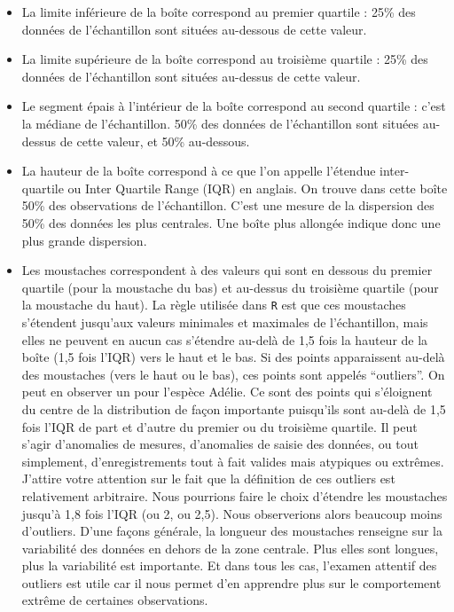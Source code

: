 \documentclass[
  a4paper,
  DIV=11,
  numbers=noendperiod,
  oneside]{scrreprt}
\providecommand{\tightlist}{%
  \setlength{\itemsep}{0pt}\setlength{\parskip}{0pt}}\usepackage{longtable,booktabs,array}
\begin{document}
\begin{itemize}
\tightlist
\item
  La limite inférieure de la boîte correspond au premier quartile : 25\%
  des données de l'échantillon sont situées au-dessous de cette valeur.
\item
  La limite supérieure de la boîte correspond au troisième quartile :
  25\% des données de l'échantillon sont situées au-dessus de cette
  valeur.
\item
  Le segment épais à l'intérieur de la boîte correspond au second
  quartile : c'est la médiane de l'échantillon. 50\% des données de
  l'échantillon sont situées au-dessus de cette valeur, et 50\%
  au-dessous.
\item
  La hauteur de la boîte correspond à ce que l'on appelle l'étendue
  inter-quartile ou Inter Quartile Range (IQR) en anglais. On trouve
  dans cette boîte 50\% des observations de l'échantillon. C'est une
  mesure de la dispersion des 50\% des données les plus centrales. Une
  boîte plus allongée indique donc une plus grande dispersion.
\item
  Les moustaches correspondent à des valeurs qui sont en dessous du
  premier quartile (pour la moustache du bas) et au-dessus du troisième
  quartile (pour la moustache du haut). La règle utilisée dans
  \texttt{R} est que ces moustaches s'étendent jusqu'aux valeurs
  minimales et maximales de l'échantillon, mais elles ne peuvent en
  aucun cas s'étendre au-delà de 1,5 fois la hauteur de la boîte (1,5
  fois l'IQR) vers le haut et le bas. Si des points apparaissent au-delà
  des moustaches (vers le haut ou le bas), ces points sont appelés
  ``outliers''. On peut en observer un pour l'espèce Adélie. Ce sont des
  points qui s'éloignent du centre de la distribution de façon
  importante puisqu'ils sont au-delà de 1,5 fois l'IQR de part et
  d'autre du premier ou du troisième quartile. Il peut s'agir
  d'anomalies de mesures, d'anomalies de saisie des données, ou tout
  simplement, d'enregistrements tout à fait valides mais atypiques ou
  extrêmes. J'attire votre attention sur le fait que la définition de
  ces outliers est relativement arbitraire. Nous pourrions faire le
  choix d'étendre les moustaches jusqu'à 1,8 fois l'IQR (ou 2, ou 2,5).
  Nous observerions alors beaucoup moins d'outliers. D'une façons
  générale, la longueur des moustaches renseigne sur la variabilité des
  données en dehors de la zone centrale. Plus elles sont longues, plus
  la variabilité est importante. Et dans tous les cas, l'examen attentif
  des outliers est utile car il nous permet d'en apprendre plus sur le
  comportement extrême de certaines observations.
\end{itemize}
\end{document}
